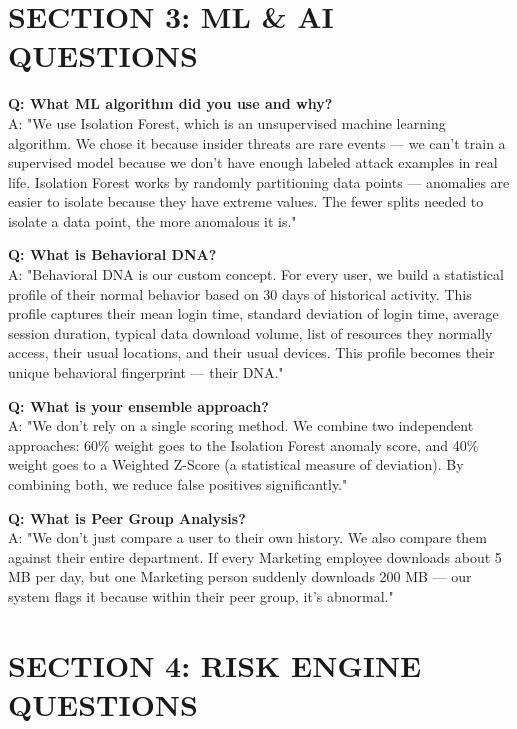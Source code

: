 \documentclass[12pt,a4paper]{article}
\begin{document}
\section*{SECTION 3: ML \& AI QUESTIONS}

\textbf{Q: What ML algorithm did you use and why?} \\
A: "We use Isolation Forest, which is an unsupervised machine learning algorithm. We chose it because insider threats are rare events — we can't train a supervised model because we don't have enough labeled attack examples in real life. Isolation Forest works by randomly partitioning data points — anomalies are easier to isolate because they have extreme values. The fewer splits needed to isolate a data point, the more anomalous it is."
\vspace{10pt}

\textbf{Q: What is Behavioral DNA?} \\
A: "Behavioral DNA is our custom concept. For every user, we build a statistical profile of their normal behavior based on 30 days of historical activity. This profile captures their mean login time, standard deviation of login time, average session duration, typical data download volume, list of resources they normally access, their usual locations, and their usual devices. This profile becomes their unique behavioral fingerprint — their DNA."
\vspace{10pt}

\textbf{Q: What is your ensemble approach?} \\
A: "We don't rely on a single scoring method. We combine two independent approaches: 60\% weight goes to the Isolation Forest anomaly score, and 40\% weight goes to a Weighted Z-Score (a statistical measure of deviation). By combining both, we reduce false positives significantly."
\vspace{10pt}

\textbf{Q: What is Peer Group Analysis?} \\
A: "We don't just compare a user to their own history. We also compare them against their entire department. If every Marketing employee downloads about 5 MB per day, but one Marketing person suddenly downloads 200 MB — our system flags it because within their peer group, it's abnormal."
\vspace{10pt}


\section*{SECTION 4: RISK ENGINE QUESTIONS}
\end{document}
